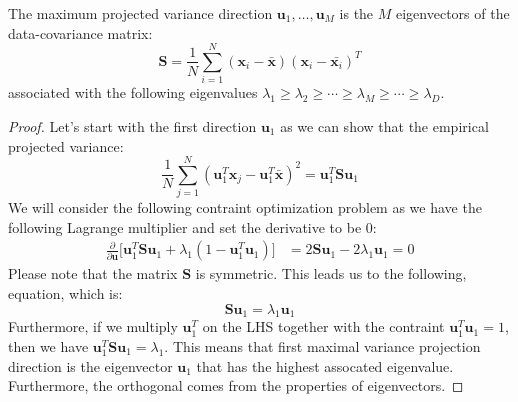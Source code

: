 \begin{proposition}
    The maximum projected variance direction $\boldsymbol u_1,\dots,\boldsymbol u_M$ is the $M$ eigenvectors of the data-covariance matrix:
    \begin{equation*}
        \boldsymbol S = \frac{1}{N}\sum^N_{i=1}(\boldsymbol x_i - \bar{\boldsymbol x})(\boldsymbol x_i-\bar{\boldsymbol x_i})^T
    \end{equation*}
    associated with the following eigenvalues $\lambda_1\ge\lambda_2\ge\cdots\ge\lambda_M\ge\cdots\ge\lambda_D$. 
\end{proposition}
\begin{proof}
    Let's start with the first direction $\boldsymbol u_1$ as we can show that the empirical projected variance:
    \begin{equation*}
        \frac{1}{N}\sum^N_{j=1}(\boldsymbol u_1^T\boldsymbol x_j - \boldsymbol u_1^T\bar{\boldsymbol x})^2 = \boldsymbol u_1^T\boldsymbol S\boldsymbol u_1
    \end{equation*}
    We will consider the following contraint optimization problem as we have the following Lagrange multiplier and set the derivative to be $0$:
    \begin{equation*}
    \begin{aligned}
        \frac{\partial}{\partial \boldsymbol u} \Big[\boldsymbol u_1^T\boldsymbol S\boldsymbol u_1 + \lambda_1(1 - \boldsymbol u_1^T\boldsymbol u_1)\Big] &= 2\boldsymbol S\boldsymbol u_1 - 2\lambda_1\boldsymbol u_1 = 0
    \end{aligned}
    \end{equation*}
    Please note that the matrix $\boldsymbol S$ is symmetric. This leads us to the following, equation, which is:
    \begin{equation*}
        \boldsymbol S \boldsymbol u_1 = \lambda_1\boldsymbol u_1
    \end{equation*}
    Furthermore, if we multiply $\boldsymbol u_1^T$ on the LHS together with the contraint $\boldsymbol u_1^T\boldsymbol u_1=1$, then we have $\boldsymbol u_1^T\boldsymbol S\boldsymbol u_1 = \lambda_1$. This means that  first maximal variance projection direction is the eigenvector $\boldsymbol u_1$ that has the highest assocated eigenvalue.  Furthermore, the orthogonal comes from the properties of eigenvectors. 
\end{proof}

